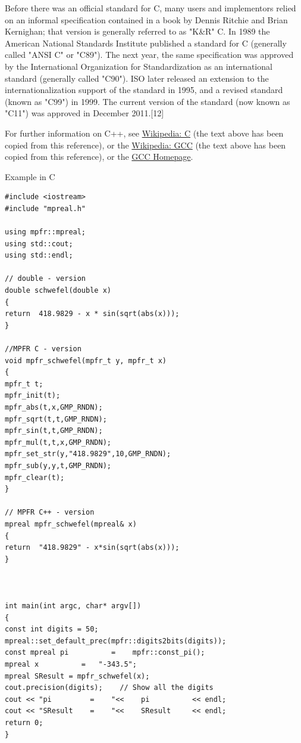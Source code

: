 \vpara
Before there was an official standard for C, many users and implementors relied on an informal specification contained in a book by Dennis Ritchie and Brian Kernighan; that version is generally referred to as "K\&R" C. In 1989 the American National Standards Institute published a standard for C (generally called "ANSI C" or "C89"). The next year, the same specification was approved by the International Organization for Standardization as an international standard (generally called "C90"). ISO later released an extension to the internationalization support of the standard in 1995, and a revised standard (known as "C99") in 1999. The current version of the standard (now known as "C11") was approved in December 2011.[12]


\vpara
For further information on C++, see \href{http://en.wikipedia.org/wiki/C_(programming_language)}{Wikipedia: C} (the text above has been copied from this reference), or the  \href{http://en.wikipedia.org/wiki/GNU_Compiler_Collection}{Wikipedia: GCC} (the text above has been copied from this reference), or the  \href{http://gcc.gnu.org/}{GCC Homepage}.



\vpara
Example in C


\begin{lstlisting}
#include <iostream>
#include "mpreal.h"

using mpfr::mpreal;    
using std::cout;
using std::endl;

// double - version
double schwefel(double x)
{
return  418.9829 - x * sin(sqrt(abs(x)));
}

//MPFR C - version
void mpfr_schwefel(mpfr_t y, mpfr_t x)
{
mpfr_t t;
mpfr_init(t);
mpfr_abs(t,x,GMP_RNDN);
mpfr_sqrt(t,t,GMP_RNDN);
mpfr_sin(t,t,GMP_RNDN);
mpfr_mul(t,t,x,GMP_RNDN);
mpfr_set_str(y,"418.9829",10,GMP_RNDN);
mpfr_sub(y,y,t,GMP_RNDN);
mpfr_clear(t);
}

// MPFR C++ - version
mpreal mpfr_schwefel(mpreal& x)
{
return  "418.9829" - x*sin(sqrt(abs(x)));
}



int main(int argc, char* argv[])
{
const int digits = 50; 
mpreal::set_default_prec(mpfr::digits2bits(digits));
const mpreal pi          =    mpfr::const_pi();
mpreal x          =   "-343.5"; 
mpreal SResult = mpfr_schwefel(x);
cout.precision(digits);    // Show all the digits
cout << "pi         =    "<<    pi          << endl;    
cout << "SResult    =    "<<    SResult     << endl;   
return 0;
}
\end{lstlisting}



